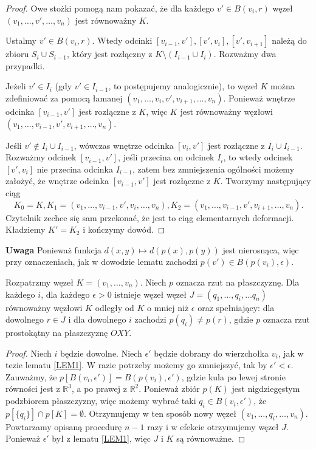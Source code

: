\begin{proof}
Owe stożki pomogą nam pokazać, że dla każdego $v'\in B(v_i, r)$ węzeł $(v_1, \ldots, v', \ldots, v_n)$ jest równoważny $K$.

Ustalmy $v'\in B(v_i, r)$. Wtedy odcinki $[v_{i-1}, v'], [v',v_i], [v', v_{i+1}]$ należą do zbioru $S_i\cup S_{i-1}$, który jest rozłączny z $K\setminus(I_{i-1}\cup I_i)$. 
Rozważmy dwa przypadki. 

Jeżeli $v'\in I_i$ (gdy $v'\in I_{i-1}$, to postępujemy analogicznie), to węzeł $K$ można zdefiniować za pomocą łamanej $(v_1, \ldots, v_i, v', v_{i+1}, \ldots, v_n)$. Ponieważ
wnętrze odcinka $[v_{i-1}, v']$ jest rozłączne z $K$, więc $K$ jest równoważny węzłowi $(v_1, \ldots, v_{i-1}, v', v_{i+1}, \ldots, v_n)$.

Jeśli $v'\not\in I_i\cup I_{i-1}$, wówczas wnętrze odcinka $[v_i, v']$ jest rozłączne z $I_i\cup I_{i-1}$. Rozważmy odcinek $[v_{i-1}, v']$, jeśli przecina on odcinek $I_i$, to 
wtedy odcinek $[v', v_i]$ nie przecina odcinka $I_{i-1}$, zatem bez zmniejszenia ogólności możemy założyć, że wnętrze odcinka $[v_{i-1}, v']$ jest rozłączne z $K$. Tworzymy
następujący ciąg
\begin{displaymath}
 K_0 = K, K_1 = (v_1,\ldots, v_{i-1}, v', v_i, \ldots, v_n), K_2 = (v_1,\ldots, v_{i-1}, v', v_{i+1}, \ldots, v_n).
\end{displaymath}
Czytelnik zechce się sam przekonać, że jest to ciąg elementarnych deformacji. 
Kładziemy $K' = K_2$ i kończymy dowód.
\end{proof}
\textbf{Uwaga} Ponieważ funkcja
 $ d(x,y)\mapsto d(p(x), p(y))$ jest nierosnąca, więc przy oznaczeniach, jak w dowodzie lematu zachodzi $p(v')\in B(p(v_i),\epsilon)$.

\begin{lemat}
 \label{LEM2}
 Rozpatrzmy węzeł $K = (v_1, \ldots, v_n)$. Niech $p$ oznacza rzut na płaszczyznę. Dla każdego $i$, dla każdego $\epsilon > 0$ istnieje węzeł
 węzeł $J = (q_1, \ldots, q_i, \ldots q_n)$ równoważny węzłowi $K$ odległy od $K$ o mniej niż $\epsilon$ oraz spełniający:
 dla dowolnego $r\in J$ i dla dowolnego $i$ zachodzi $p(q_i)\neq p(r)$, gdzie $p$ oznacza rzut prostokątny na płaszczyznę $OXY$.
\end{lemat}
 \begin{proof}
  Niech $i$ będzie dowolne. 
  Niech $\epsilon'$ będzie dobrany do wierzchołka $v_i$, jak w tezie lematu \ref{LEM1}. W razie potrzeby możemy go zmniejszyć, tak by $\epsilon'<\epsilon$. 
  Zauważmy, że $p[B(v_i, \epsilon')] = B(p(v_i),\epsilon')$, gdzie kula po lewej stronie równości jest z $\mathbb{R}^3$, a po prawej z $\mathbb{R}^2$. Ponieważ zbiór $p(K)$ jest nigdziegęstym podzbiorem płaszczyzny, więc możemy wybrać taki $q_i\in B(v_i, \epsilon')$,
  że $p[\lbrace q_i\rbrace]\cap p[K] = \emptyset$. Otrzymujemy w ten sposób nowy węzeł $(v_1, \ldots, q_i, \ldots, v_n)$. Powtarzamy opisaną procedurę $n-1$ razy i w efekcie 
  otrzymujemy węzeł $J$. Ponieważ $\epsilon'$ był z lematu \ref{LEM1}, więc $J$ i $K$ są równoważne. 
 \end{proof}


